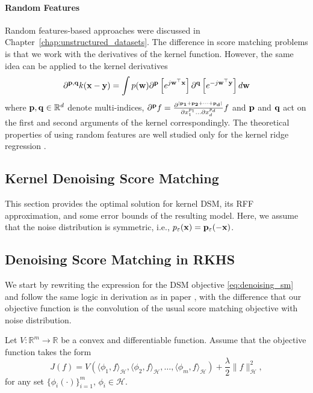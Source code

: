 \paragraph*{Random Features}
\label{sec:inrto_rff}
Random features-based approaches were discussed in Chapter~\ref{chap:unstructured_datasets}.
The difference in score matching problems is that
we work with the derivatives of the kernel function.
However, the same idea can be applied to the kernel derivatives
\begin{equation}
    \partial^{{\bf p}, {\bf q}} k({\bf x - y}) = \int p({\bf w}) \partial^{{\bf p}}\left[e^{j\bf{w^\top x}}\right]\partial^{{\bf q}}\left[e^{-j\bf{w^\top y}}\right]d\bf{w}
\end{equation}
where ${\bf p}, {\bf q} \in \mathbb{R}^d$ denote multi-indices,
$\partial^{\bf{p}} f =
\frac{\partial^{|\bf{p}_1 + \bf{p}_2 + \cdots + \bf{p}_d |} }{\partial x_1^{p_1} \ldots
\partial x_d^{p_d}} f$
and $\bf{p}$ and $\bf{q}$ act on the first and second arguments of
the kernel correspondingly.
The theoretical properties of using random features are well studied only for the
kernel ridge regression \cite{aless2016generalization, li2018unified}.

\subsection{Kernel Denoising Score Matching}
\label{chap:body}
This section provides the optimal solution for kernel DSM,
its RFF approximation, and some error bounds of the resulting model.
Here, we assume that the noise distribution is symmetric, i.e.,
$p_{\varepsilon}(\bf{x}) = p_{\varepsilon}(-\bf{x})$.

\subsection{Denoising Score Matching in RKHS}
We start by rewriting the expression for the DSM objective
\eqref{eq:denoising_sm}
and follow the same logic in derivation as in paper \cite{Gretton2013},
with the difference that our objective function is the convolution of the usual
score matching objective with noise distribution.

Let $V: \mathbb{R}^m \to \mathbb{R}$ be a convex and differentiable function.
Assume that the objective function takes the form
\[
    J(f) = V(\langle \phi_1, f\rangle_\mathcal{H},
             \langle \phi_2, f\rangle_\mathcal{H}, \ldots,
             \langle \phi_m, f\rangle_\mathcal{H}) + \frac{\lambda}{2}\|f\|^2_\mathcal{H},
\]
for any set $\{\phi_i(\cdot)\}_{i = 1}^m$, $\phi_i \in \mathcal{H}$.

